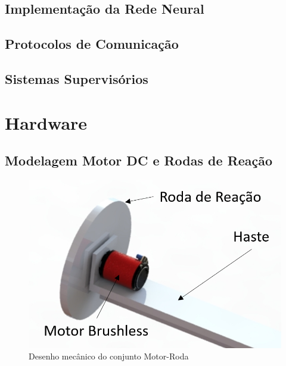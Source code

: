 \subsection{Implementação da Rede Neural}

\subsection{Protocolos de Comunicação}

\subsection{Sistemas Supervisórios}


\section{Hardware}


\subsection{Modelagem Motor DC e Rodas de Reação}

\begin{figure}[H]
  \caption{Desenho mecânico do conjunto Motor-Roda}
  \begin{center}
      \includegraphics[scale=.45]{img/motor_roda_desenho}
  \end{center}
  \label{fig:motor_roda_desenho}
\end{figure}


